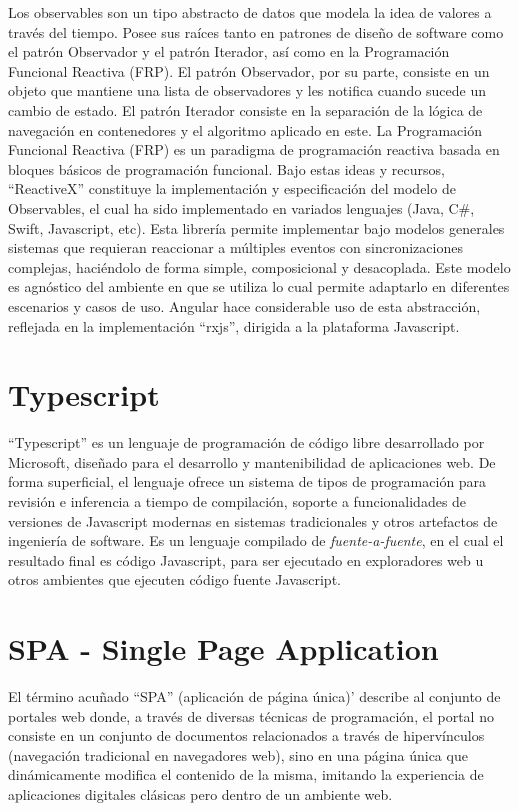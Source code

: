 Los observables son un tipo abstracto de datos que modela la idea de valores a través del tiempo. Posee sus raíces tanto en patrones de diseño de software como el patrón Observador y el patrón Iterador, así como en la Programación Funcional Reactiva (FRP). El patrón Observador, por su parte, consiste en un objeto que mantiene una lista de observadores y les notifica cuando sucede un cambio de estado. El patrón Iterador consiste en la separación de la lógica de navegación en contenedores y el algoritmo aplicado en este. La Programación Funcional Reactiva (FRP) es un paradigma de programación reactiva basada en bloques básicos de programación funcional. Bajo estas ideas y recursos, ``ReactiveX'' constituye la implementación y especificación del modelo de Observables, el cual ha sido implementado en variados lenguajes (Java, C\#, Swift, Javascript, etc). Esta librería permite implementar bajo modelos generales sistemas que requieran reaccionar a múltiples eventos con sincronizaciones complejas, haciéndolo de forma simple, composicional y desacoplada. Este modelo es agnóstico del ambiente en que se utiliza lo cual permite adaptarlo en diferentes escenarios y casos de uso. Angular hace considerable uso de esta abstracción, reflejada en la implementación ``rxjs'', dirigida a la plataforma Javascript.

\section{Typescript}

``Typescript'' es un lenguaje de programación de código libre desarrollado por Microsoft, diseñado para el desarrollo y mantenibilidad de aplicaciones web. De forma superficial, el lenguaje ofrece un sistema de tipos de programación para revisión e inferencia a tiempo de compilación, soporte a funcionalidades de versiones de Javascript modernas en sistemas tradicionales y otros artefactos de ingeniería de software. Es un lenguaje compilado de \textit{fuente-a-fuente}, en el cual el resultado final es código Javascript, para ser ejecutado en exploradores web u otros ambientes que ejecuten código fuente Javascript.

\section{SPA - Single Page Application}

El término acuñado ``SPA'' (aplicación de página única)' describe al conjunto de portales web donde, a través de diversas técnicas de programación, el portal no consiste en un conjunto de documentos relacionados a través de hipervínculos (navegación tradicional en navegadores web), sino en una página única que dinámicamente modifica el contenido de la misma, imitando la experiencia de aplicaciones digitales clásicas pero dentro de un ambiente web.

